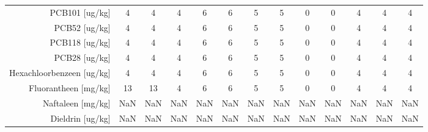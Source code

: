 \begin{tabular}{ r |c | c | c | c | c |c | c | c | c | c | c | c }
PCB101 [ug/kg] &4 & 4 & 4 & 6 & 6 & 5 & 5 & 0 & 0 & 4 & 4 & 4 \\
PCB52 [ug/kg] &4 & 4 & 4 & 6 & 6 & 5 & 5 & 0 & 0 & 4 & 4 & 4 \\
PCB118 [ug/kg] &4 & 4 & 4 & 6 & 6 & 5 & 5 & 0 & 0 & 4 & 4 & 4 \\
PCB28 [ug/kg] &4 & 4 & 4 & 6 & 6 & 5 & 5 & 0 & 0 & 4 & 4 & 4 \\
Hexachloorbenzeen [ug/kg] &4 & 4 & 4 & 6 & 6 & 5 & 5 & 0 & 0 & 4 & 4 & 4 \\
Fluorantheen [mg/kg] &13 & 13 & 4 & 6 & 6 & 5 & 5 & 0 & 0 & 4 & 4 & 4 \\
Naftaleen [mg/kg] &NaN & NaN & NaN & NaN & NaN & NaN & NaN & NaN & NaN & NaN & NaN & NaN \\
Dieldrin [ug/kg] &NaN & NaN & NaN & NaN & NaN & NaN & NaN & NaN & NaN & NaN & NaN & NaN \\
\end{tabular}    
